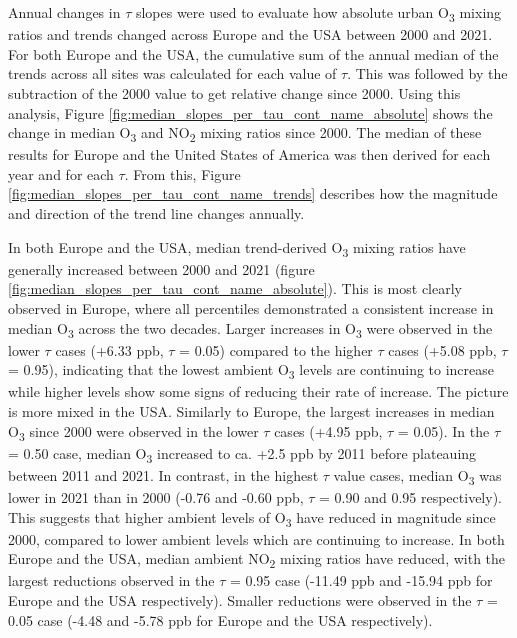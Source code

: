 \documentclass[journal abbreviation, manuscript]{copernicus}
\begin{document}
Annual changes in $\tau$ slopes were used to evaluate how absolute urban O\textsubscript{3} mixing ratios and trends changed across Europe and the USA between 2000 and 2021. For both Europe and the USA, the cumulative sum of the annual median of the trends across all sites was calculated for each value of $\tau$. This was followed by the subtraction of the 2000 value to get relative change since 2000. Using this analysis, Figure \ref{fig:median_slopes_per_tau_cont_name_absolute} shows the change in median O\textsubscript{3} and NO\textsubscript{2} mixing ratios since 2000. The median of these results for Europe and the United States of America was then derived for each year and for each $\tau$. From this, Figure \ref{fig:median_slopes_per_tau_cont_name_trends} describes how the magnitude and direction of the trend line changes annually.

In both Europe and the USA, median trend-derived O\textsubscript{3} mixing ratios have generally increased between 2000 and 2021 (figure \ref{fig:median_slopes_per_tau_cont_name_absolute}). This is most clearly observed in Europe, where all percentiles demonstrated a consistent increase in median O\textsubscript{3} across the two decades. Larger increases in O\textsubscript{3} were observed in the lower $\tau$ cases (+6.33 ppb, $\tau$ = 0.05) compared to the higher $\tau$ cases (+5.08 ppb, $\tau$ = 0.95), indicating that the lowest ambient O\textsubscript{3} levels are continuing to increase while higher levels show some signs of reducing their rate of increase. The picture is more mixed in the USA. Similarly to Europe, the largest increases in median O\textsubscript{3} since 2000 were observed in the lower $\tau$ cases (+4.95 ppb, $\tau$ = 0.05). In the $\tau$ = 0.50 case, median O\textsubscript{3} increased to ca. +2.5 ppb by 2011 before plateauing between 2011 and 2021. In contrast, in the highest $\tau$ value cases, median O\textsubscript{3} was lower in 2021 than in 2000 (-0.76 and -0.60 ppb, $\tau$ = 0.90 and 0.95 respectively). This suggests that higher ambient levels of O\textsubscript{3} have reduced in magnitude since 2000, compared to lower ambient levels which are continuing to increase. In both Europe and the USA, median ambient NO\textsubscript{2} mixing ratios have reduced, with the largest reductions observed in the $\tau$ = 0.95 case (-11.49 ppb and -15.94 ppb for Europe and the USA respectively). Smaller reductions were observed in the $\tau$ = 0.05 case (-4.48 and -5.78 ppb for Europe and the USA respectively).
\end{document}
